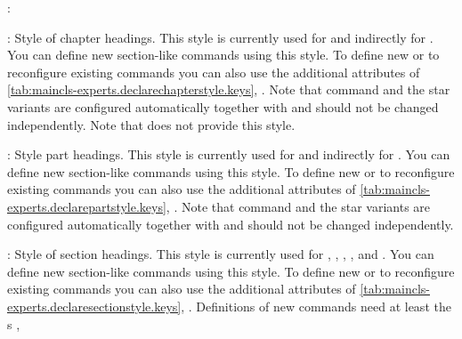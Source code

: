 \begin{labeling}{:}
\item[\PValue{chapter}:] Style of chapter headings. This style is currently used
  for  and indirectly for
  . You can define new
  section-like commands using this style. To define new or to reconfigure
  existing commands you can also use the additional attributes of
  \autoref{tab:maincls-experts.declarechapterstyle.keys},
  .
  Note that command  and the
  star variants are configured automatically together with
   and should not be changed independently. Note
  that  does not
  provide this style.
\item[\PValue{part}:] Style part headings. This style is
  currently used for  and indirectly
  for . You can define new
  section-like commands using this style. To define new or to reconfigure
  existing commands you can also use the additional attributes of
  \autoref{tab:maincls-experts.declarepartstyle.keys},
  .
  Note that command  and the
  star variants are configured automatically together with
   and should not be changed independently.
\item[\PValue{section}:] Style of section headings. This style is currently
  used for ,
  ,
  ,
  , and
  . You can define
  new section-like commands using this style. To define new or to reconfigure
  existing commands you can also use the additional attributes of
  \autoref{tab:maincls-experts.declaresectionstyle.keys},
  . Definitions of
  new commands need at least the s ,

\end{labeling}
